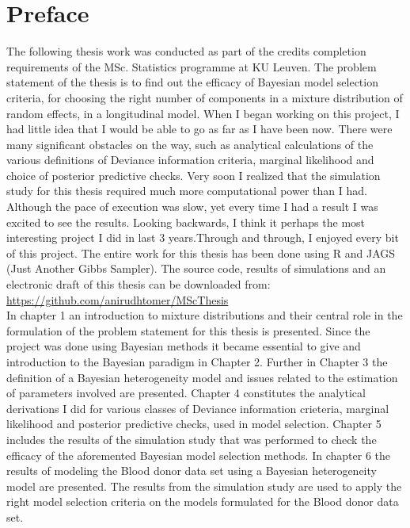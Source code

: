 
\chapter{Preface}
\label{ch : preface}

The following thesis work was conducted as part of the credits completion requirements of the MSc. Statistics programme at KU Leuven. The problem statement of the thesis is to find out the efficacy of Bayesian model selection criteria, for choosing the right number of components in a mixture distribution of random effects, in a longitudinal model. When I began working on this project, I had little idea that I would be able to go as far as I have been now. There were many significant obstacles on the way, such as analytical calculations of the various definitions of Deviance information criteria, marginal likelihood and choice of posterior predictive checks. Very soon I realized that the simulation study for this thesis required much more computational power than I had. Although the pace of execution was slow, yet every time I had a result I was excited to see the results. Looking backwards, I think it perhaps the most interesting project I did in last 3 years.Through and through, I enjoyed every bit of this project. The entire work for this thesis has been done using R and JAGS (Just Another Gibbs Sampler). The source code, results of simulations and an electronic draft of this thesis can be downloaded from:\\
\url{https://github.com/anirudhtomer/MScThesis}\\

In chapter 1 an introduction to mixture distributions and their central role in the formulation of the problem statement for this thesis is presented. Since the project was done using Bayesian methods it became essential to give and introduction to the Bayesian paradigm in Chapter 2. Further in Chapter 3 the definition of a Bayesian heterogeneity model and issues related to the estimation of parameters involved are presented. Chapter 4 constitutes the analytical derivations I did for various classes of Deviance information crieteria, marginal likelihood and posterior predictive checks, used in model selection. Chapter 5 includes the results of the simulation study that was performed to check the efficacy of the aforemented Bayesian model selection methods. In chapter 6 the results of modeling the Blood donor data set \citep{nasserinejad_prevalence_2015} using a Bayesian heterogeneity model are presented. The results from the simulation study are used to apply the right model selection criteria on the models formulated for the Blood donor data set.\\

